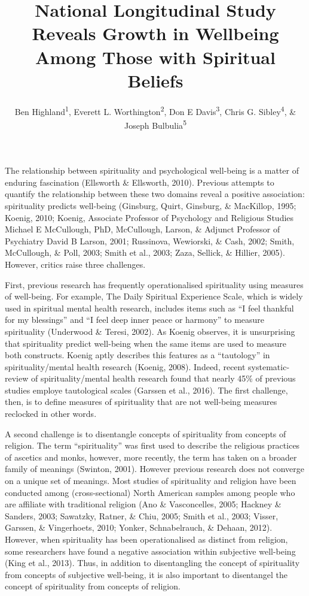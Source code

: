 \documentclass[
  english,
  man]{apa6}
\title{National Longitudinal Study Reveals Growth in Wellbeing Among Those with Spiritual Beliefs}
\author{Ben Highland\textsuperscript{1}, Everett L. Worthington\textsuperscript{2}, Don E Davis\textsuperscript{3}, Chris G. Sibley\textsuperscript{4}, \& Joseph Bulbulia\textsuperscript{5}}
\date{}
\affiliation{\phantom{0}}
\begin{document}
\maketitle

The relationship between spirituality and psychological well-being is a matter of enduring fascination (Ellsworth \& Ellsworth, 2010). Previous attempts to quantify the relationship between these two domains reveal a positive association: spirituality predicts well-being (Ginsburg, Quirt, Ginsburg, \& MacKillop, 1995; Koenig, 2010; Koenig, Associate Professor of Psychology and Religious Studies Michael E McCullough, PhD, McCullough, Larson, \& Adjunct Professor of Psychiatry David B Larson, 2001; Russinova, Wewiorski, \& Cash, 2002; Smith, McCullough, \& Poll, 2003; Smith et al., 2003; Zaza, Sellick, \& Hillier, 2005). However, critics raise three challenges.

First, previous research has frequently operationalised spirituality using measures of well-being. For example, The Daily Spiritual Experience Scale, which is widely used in spiritual mental health research, includes items such as \enquote{I feel thankful for my blessings} and \enquote{I feel deep inner peace or harmony} to measure spirituality (Underwood \& Teresi, 2002). As Koenig observes, it is unsurprising that spirituality predict well-being when the same items are used to measure both constructs. Koenig aptly describes this features as a \enquote{tautology} in spirituality/mental health research (Koenig, 2008). Indeed, recent systematic-review of spirituality/mental health research found that nearly 45\% of previous studies employe tautological scales (Garssen et al., 2016). The first challenge, then, is to define measures of spirituality that are not well-being measures reclocked in other words.

A second challenge is to disentangle concepts of spirituality from concepts of religion. The term \enquote{spirituality} was first used to describe the religious practices of ascetics and monks, however, more recently, the term has taken on a broader family of meanings (Swinton, 2001). However previous research does not converge on a unique set of meanings. Most studies of spirituality and religion have been conducted among (cross-sectional) North American samples among people who are affiliate with traditional religion (Ano \& Vasconcelles, 2005; Hackney \& Sanders, 2003; Sawatzky, Ratner, \& Chiu, 2005; Smith et al., 2003; Visser, Garssen, \& Vingerhoets, 2010; Yonker, Schnabelrauch, \& Dehaan, 2012). However, when spirituality has been operationalised as distinct from religion, some researchers have found a negative association within subjective well-being (King et al., 2013). Thus, in addition to disentangling the concept of spirituality from concepts of subjective well-being, it is also important to disentangel the concept of spirituality from concepts of religion.
\end{document}
